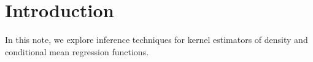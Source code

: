 
\section{Introduction}

In this note, we explore inference techniques for kernel estimators of density
and conditional mean regression functions.



